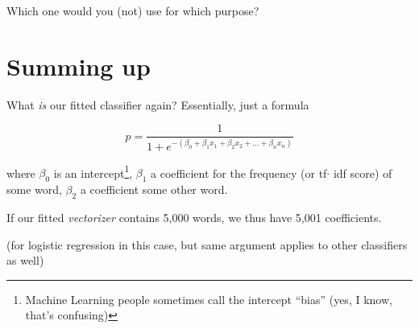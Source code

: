 \begin{frame}{Which one would you (not) use for which purpose?}
\end{frame}




\section{Summing up}


\begin{frame}{What \emph{is} our fitted classifier again?}
	Essentially, just a formula 
	
	$$p = \frac{1}{1 + e^{-(\beta_0 + \beta_1 x_1 + \beta_2 x_2 + \ldots + \beta_n x_n)}}$$
	
	where $\beta_0$ is an intercept\footnote{Machine Learning people sometimes call the intercept ``bias'' (yes, I know, that's confusing)}, $\beta_1$ a coefficient for the frequency (or tf$\cdot$ idf score) of some word, $\beta_2$ a coefficient some other word.
	
	If our fitted \emph{vectorizer} contains 5,000 words, we thus have 5,001 coefficients.
	
	\tiny{(for logistic regression in this case, but same argument applies to other classifiers as well)}
	
\end{frame}

